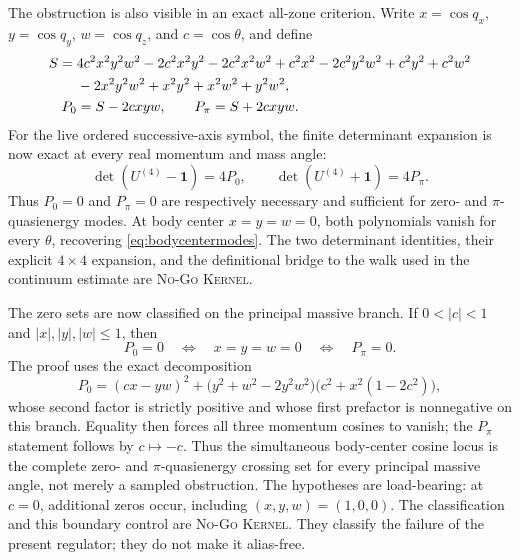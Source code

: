 \documentclass[11pt]{article}
\newcommand{\Kernel}{\textcolor{kernelcolor}{\textsc{Kernel}}}
\newcommand{\NoGo}{\textsc{No-Go}}
\newcommand{\id}{\mathbf{1}}
\begin{document}
The obstruction is also visible in an exact all-zone criterion.  Write
$x=\cos q_x$, $y=\cos q_y$, $w=\cos q_z$, and $c=\cos\theta$, and define
\begin{align}
 S={}&4c^2x^2y^2w^2-2c^2x^2y^2-2c^2x^2w^2+c^2x^2
      -2c^2y^2w^2+c^2y^2+c^2w^2 \notag\\
   &{}-2x^2y^2w^2+x^2y^2+x^2w^2+y^2w^2,\\
 P_0&=S-2cxyw,
 \qquad
 P_\pi=S+2cxyw.
\end{align}
For the live ordered successive-axis symbol, the finite determinant expansion
is now exact at every real momentum and mass angle:
\begin{equation}\label{eq:fullblochdet}
 \det\!\left(U^{(4)}-\id\right)=4P_0,
 \qquad
 \det\!\left(U^{(4)}+\id\right)=4P_\pi.
\end{equation}
Thus $P_0=0$ and $P_\pi=0$ are respectively necessary and sufficient for
zero- and $\pi$-quasienergy modes.  At body center $x=y=w=0$, both polynomials
vanish for every $\theta$, recovering \eqref{eq:bodycentermodes}.  The two
determinant identities, their explicit $4\times4$ expansion, and the
definitional bridge to the walk used in the continuum estimate are
\NoGo{} \Kernel{}.

The zero sets are now classified on the principal massive branch.  If
$0<|c|<1$ and $|x|,|y|,|w|\leq1$, then
\begin{equation}\label{eq:fullblochzeroset}
 P_0=0 \quad\Longleftrightarrow\quad x=y=w=0
 \quad\Longleftrightarrow\quad P_\pi=0.
\end{equation}
The proof uses the exact decomposition
\begin{equation}
 P_0=(cx-yw)^2+
 \bigl(y^2+w^2-2y^2w^2\bigr)
 \bigl(c^2+x^2(1-2c^2)\bigr),
\end{equation}
whose second factor is strictly positive and whose first prefactor is
nonnegative on this branch.  Equality then forces all three momentum cosines
to vanish; the $P_\pi$ statement follows by $c\mapsto-c$.  Thus the simultaneous
body-center cosine locus is the complete zero- and $\pi$-quasienergy crossing
set for every principal massive angle, not merely a sampled obstruction.
The hypotheses are load-bearing: at $c=0$, additional zeros occur, including
$(x,y,w)=(1,0,0)$.  The classification and this boundary control are
\NoGo{} \Kernel{}.  They classify the failure of the present regulator; they
do not make it alias-free.
\end{document}
